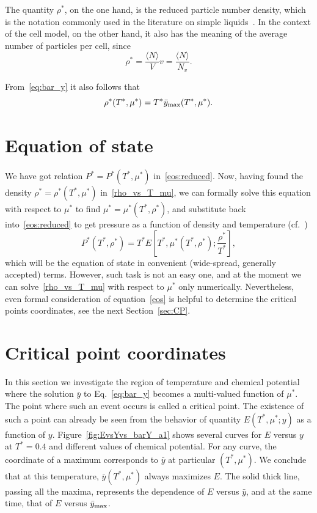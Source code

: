 \documentclass[12pt]{article}
\numberwithin{equation}{section}
\begin{document}
	The quantity $\rho^*$, on the one hand, is the reduced particle number density, which is the notation commonly used in the literature on simple liquids~\cite{HansenMcDonald13}. In the context of the cell model, on the other hand, it also has the meaning of the average number of particles per cell, since
	\begin{equation}
		\rho^* = \frac{\langle N \rangle}{V} v = \frac{\langle N \rangle}{N_v}.
	\end{equation}
	
	From~\eqref{eq:bar_y} it also follows that
	\begin{equation}
		\label{rho_vs_T_mu}
		\rho^*(T^*,\mu^*) = T^* \bar{y}_{\rm max}(T^*,\mu^*).
	\end{equation}
	
	
	\section{Equation of state}
	We have got relation $P^* = P^*(T^*, \mu^*)$ in~\eqref{eos:reduced}. Now, having found the density $\rho^* = \rho^*(T^*,\mu^*)$ in~\eqref{rho_vs_T_mu}, we can formally solve this equation with respect to $\mu^*$ to find $\mu^* = \mu^*(T^*,\rho^*)$, and substitute back into~\eqref{eos:reduced} to get pressure as a function of density and temperature (cf.~\cite[(2.28)]{KKD20})
	\begin{equation}
		\label{eos}
		P^*(T^*,\rho^*) = T^* E\left[T^*, \mu^*(T^*,\rho^*); \frac{\rho^*}{T^*}\right],
	\end{equation}
	which will be the equation of state in convenient (wide-spread, generally accepted) terms. However, such task is not an easy one, and at the moment we can solve~\eqref{rho_vs_T_mu} with respect to $\mu^*$ only numerically. Nevertheless, even formal consideration of equation~\eqref{eos} is helpful to determine the critical points coordinates, see the next Section~\ref{sec:CP}.
	
	\pagebreak
	\section{\label{sec:CP} Critical point coordinates}
	
	In this section we investigate the region of temperature and chemical potential where the solution $\bar{y}$ to Eq.~\eqref{eq:bar_y} becomes a multi-valued function of $\mu^*$. The point where such an event occurs is called a critical point. The existence of such a point can already be seen from the behavior of quantity $E(T^*,\mu^*;y)$ as a function of $y$. Figure~\ref{fig:EvsYvs_barY_a1} shows several curves for $E$ versus $y$ at $T^*=0.4$ and different values of chemical potential. For any curve, the coordinate of a maximum corresponds to $\bar{y}$ at particular $(T^*,\mu^*)$. We conclude that at this temperature, $\bar{y}(T^*,\mu^*)$ always maximizes $E$. The solid thick line, passing all the maxima, represents the dependence of $E$ versus $\bar{y}$, and at the same time, that of $E$ versus $\bar{y}_{\rm max}$.
	
\end{document}
